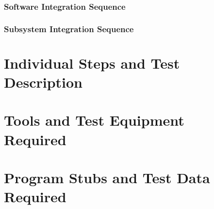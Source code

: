 \documentclass[18pt,oneside,a4paper, titlepage]{article}
\begin{document}
\subsubsection{Software	Integration	Sequence}
\subsubsection{Subsystem Integration Sequence}
\section{Individual	Steps	and	Test	Description}
\section{Tools	and	Test	Equipment	Required}
\section{Program	Stubs	and	Test	Data	Required}
\end{document}
